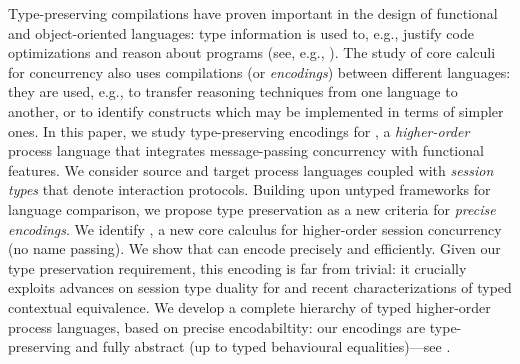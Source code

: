 

Type-preserving compilations have proven important in the design of 
functional and object-oriented languages: type information is
used to, e.g., justify code optimizations and  reason about programs (see, e.g., \cite{tap}). 
The study of core calculi for concurrency also uses compilations (or \emph{encodings})
between different languages: they are used, e.g., to transfer reasoning techniques 
from one language to another, or to identify constructs which may be implemented
in terms of simpler ones. 
In this paper, we study type-preserving encodings for \HOp, a \emph{higher-order} 
process language that integrates message-passing concurrency with functional features.
We consider source and target process languages coupled with \emph{session types} that denote interaction protocols. 
Building upon untyped frameworks for language comparison, 
we propose type preservation as a {new criteria} for \emph{precise encodings}.
We identify \HO, a new core calculus for higher-order session concurrency (no
name passing). We show that \HO can encode \HOp precisely and efficiently. 
Given our 
type preservation requirement,
this encoding is far from trivial: it crucially exploits  advances on session type duality for and recent
 characterizations of typed contextual equivalence.
We develop a complete hierarchy of typed higher-order process languages, based on 
precise encodabiltity:
our encodings are
type-preserving and fully abstract (up to typed
behavioural equalities)---see . 


